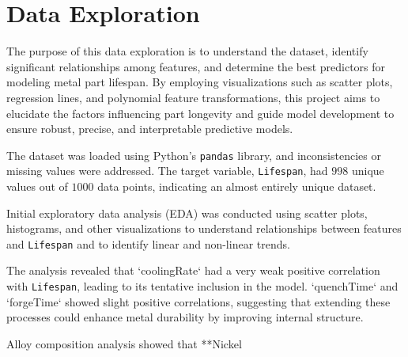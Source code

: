 \documentclass{article}
\begin{document}
\section{Data Exploration}

The purpose of this data exploration is to understand the dataset, identify significant relationships among features, and determine the best predictors for modeling metal part lifespan. By employing visualizations such as scatter plots, regression lines, and polynomial feature transformations, this project aims to elucidate the factors influencing part longevity and guide model development to ensure robust, precise, and interpretable predictive models.

The dataset was loaded using Python's \texttt{pandas} library, and inconsistencies or missing values were addressed. The target variable, \texttt{Lifespan}, had $998$ unique values out of $1000$ data points, indicating an almost entirely unique dataset.

Initial exploratory data analysis (EDA) was conducted using scatter plots, histograms, and other visualizations to understand relationships between features and \texttt{Lifespan} and to identify linear and non-linear trends.

The analysis revealed that `coolingRate` had a very weak positive correlation with \texttt{Lifespan}, leading to its tentative inclusion in the model. `quenchTime` and `forgeTime` showed slight positive correlations, suggesting that extending these processes could enhance metal durability by improving internal structure.

Alloy composition analysis showed that **Nickel%
\end{document}
